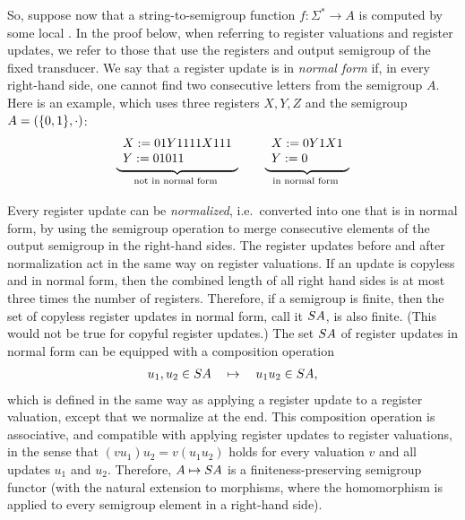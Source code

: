 So, suppose now that a string-to-semigroup function $f\colon \Sigma^* \to A$ is
computed by some local \sst. In the proof below, when referring to register valuations and register updates, we refer to those that use the registers and output semigroup of the fixed transducer. We say that a register update is in \emph{normal form} if, in every right-hand side, one cannot find two consecutive letters from the semigroup $A$.
Here is an example, which uses three registers $X,Y,Z$ and the semigroup $A = (\{0,1\}, \cdot)$:
\begin{align*}
\myunderbrace{
\begin{array}{l}
    X:= 01Y1111X111\\
Y:= 01011
\end{array}
}{not in normal form}
\qquad 
\myunderbrace{
\begin{array}{l}
    X:= 0Y1X1\\
Y:= 0
\end{array}
}{in normal form}
\end{align*}

Every register update can be \emph{normalized}, i.e.~converted into one that is in normal form, by using the semigroup operation to merge consecutive elements of the output semigroup in the right-hand sides. The  register updates before and after normalization act in the same way on register valuations.   If an update is copyless and in normal form, then the combined length of all right hand sides is at most three times the number of registers. Therefore, if a semigroup is finite, then the set of copyless register updates in normal form, call it $\functors A$,  is also finite. (This would not be true for copyful register updates.) The set $\functors A$ of register updates in normal form can be equipped with a composition operation 
\begin{align*}
    u_1,u_2 \in \functors A  \quad \mapsto \quad u_1u_2 \in \functors A,
\end{align*}
which is defined in the same way as applying a register update to a register
valuation, except that we normalize at the end. This composition operation is
associative, and  compatible with applying register updates to register
valuations, in the sense that $(vu_1)u_2 = v(u_1u_2)$ holds for every valuation
$v$ and all updates $u_1$ and $u_2$. Therefore, $A \mapsto \functors A$ is a finiteness-preserving semigroup functor (with the natural extension to morphisms, where the homomorphism is applied to every semigroup element in a right-hand side). 

